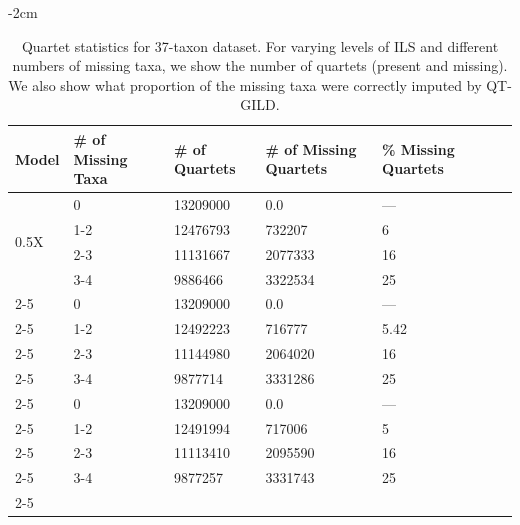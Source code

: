 \begin{table}[H]
  \small
  \centering
    \addtolength{\leftskip} {-2cm} %
    \addtolength{\rightskip}{-2cm}
    \caption{Quartet statistics for 37-taxon dataset. For varying levels of ILS and different numbers of missing taxa, we show the number of quartets (present and missing). We also show what proportion of the missing taxa were correctly imputed by QT-GILD.}
    \label{tab:qstat-37}
\begin{tabularx}{1.2\textwidth}{|X|X|X|X|X|X|X|}


\hline
Model & \# of Missing Taxa & \# of Quartets  &  \# of Missing Quartets & \% Missing Quartets \\
    \hline \hline
    \multirow{4}{0.25\textwidth}{0.5X} 
    & 0   & 13209000 &    0.0    &   --- \\  \cline{2-5}
    & 1-2 & 12476793 &	732207
 	&	6\\ \cline{2-5}
    & 2-3 & 11131667 &    2077333	&	16 \\ \cline{2-5}
    & 3-4 & 9886466 &	  3322534   &	25 \\ \cline{2-5}
    \hline
    
    \multirow{4}{0.25\textwidth}{1X} 
    & 0   & 13209000 &    0.0     & --- \\  \cline{2-5}
    & 1-2 & 12492223 &	716777    & 5.42\\ \cline{2-5}
    & 2-3 & 11144980 &	2064020   & 16 \\ \cline{2-5}
    & 3-4 & 9877714  &	3331286   & 25 \\ \cline{2-5}
    \hline
    
    \multirow{4}{0.25\textwidth}{2X} 
    & 0   & 13209000 &    0.0     & --- \\  \cline{2-5}
    & 1-2 & 12491994 &	717006   & 5 \\ \cline{2-5}
    & 2-3 & 11113410 &	2095590   & 16 \\ \cline{2-5}
    & 3-4 & 9877257  &	3331743  & 25 \\ \cline{2-5}
    \hline
    
    
    


\hline
    
\end{tabularx}

\end{table}